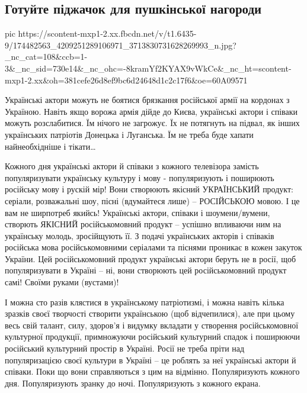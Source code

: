  
 
 
 
 
\subsection{Готуйте піджачок для пушкінської нагороди}
\label{sec:15_04_2021.fb.nitsoi_larysa.1.medal_pushkina}

\ifcmt
  pic https://scontent-mxp1-2.xx.fbcdn.net/v/t1.6435-9/174482563_4209251289106971_3713830731628269993_n.jpg?_nc_cat=108&ccb=1-3&_nc_sid=730e14&_nc_ohc=-8kramYf2KYAX9vWkCe&_nc_ht=scontent-mxp1-2.xx&oh=381cefe26d8ef9bc6d24648d1c2c17f6&oe=60A09571
\fi

Українські актори можуть не боятися брязкання російської армії на кордонах з
Україною. Навіть якщо ворожа армія дійде до Києва, українські актори і співаки
можуть розслабитися. Їм нічого не загрожує. Їх не потягнуть на підвал, як інших
українських патріотів Донецька і Луганська. Їм не треба буде хапати
найнеобхідніше і тікати… 

Кожного дня українські актори й співаки з кожного телевізора замість
популяризувати українську культуру і мову -  популяризують і поширюють
російську мову і рускій мір! Вони створюють якісний УКРАЇНСЬКИЙ продукт:
серіали, розважальні шоу, пісні (вдумайтеся лише) – РОСІЙСЬКОЮ мовою. І це вам
не ширпотреб якийсь! Українські актори, співаки і шоумени/вумени, створють
ЯКІСНИЙ російськомовний продукт – успішно впливаючи ним на українську молодь,
зросійщують її. З подачі українських акторів і співаків російська мова
російськомовними серіалами та піснями проникає в кожен закуток України. Цей
російськомовний продукт українські актори беруть не в росії, щоб популяризувати
в Україні – ні, вони створюють цей російськомовний продукт самі! Своїми руками
(вустами)!

І можна сто разів клястися в українському патріотизмі, і можна навіть кілька
зразків своєї творчості створити українською (щоб відчепилися), але при цьому
весь свій талант, силу, здоров’я і видумку вкладати у створення російськомовної
культурної продукції, примножуючи російський  культурний спадок і поширюючи
російський культурний простір в Україні. Росії не треба пріти над
популяризацією своєї культури в Україні – це роблять за неї українські актори й
співаки. Поки що вони справляються з цим на відмінно. Популяризують кожного
дня. Популяризують зранку до ночі. Популяризують з кожного екрана. 


